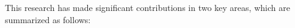 	
		This research has made significant contributions in two key areas, which are summarized as follows:
		
